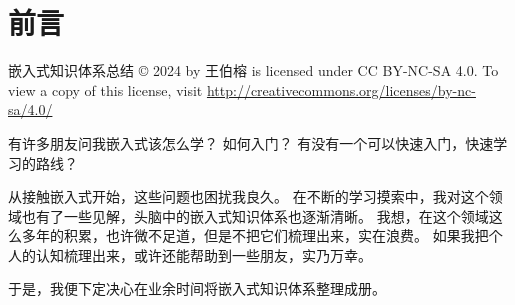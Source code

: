 \chapter*{前言}
%

\begin{minipage}[b]{0.9\textwidth}
\setlength{\parskip}{0.5\baselineskip}
嵌入式知识体系总结  © 2024 by 王伯榕
is licensed under CC BY-NC-SA 4.0.
To view a copy of this license, visit
\url{http://creativecommons.org/licenses/by-nc-sa/4.0/}
\end{minipage}

\vspace*{2\baselineskip}

有许多朋友问我嵌入式该怎么学？
如何入门？
有没有一个可以快速入门，快速学习的路线？

从接触嵌入式开始，这些问题也困扰我良久。
在不断的学习摸索中，我对这个领域也有了一些见解，头脑中的嵌入式知识体系也逐渐清晰。
我想，在这个领域这么多年的积累，也许微不足道，但是不把它们梳理出来，实在浪费。
如果我把个人的认知梳理出来，或许还能帮助到一些朋友，实乃万幸。

于是，我便下定决心在业余时间将嵌入式知识体系整理成册。
